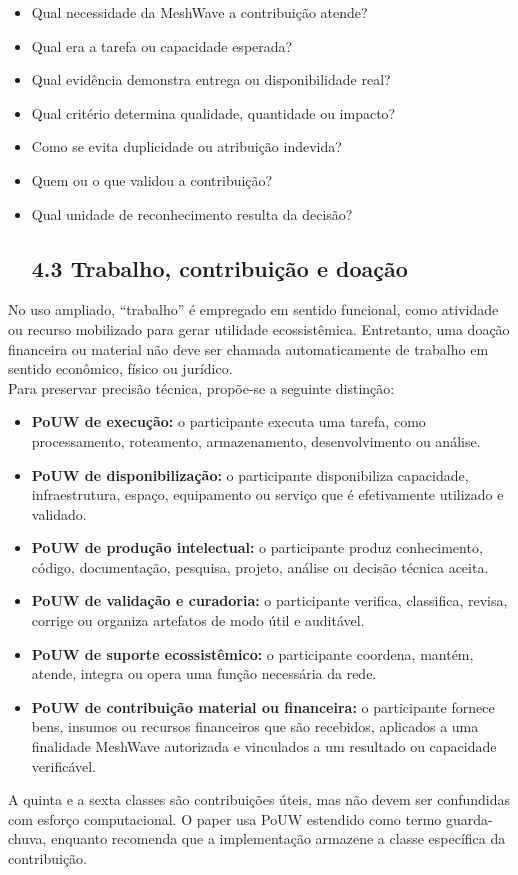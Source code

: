 \documentclass[12pt,a4paper]{article}
\begin{document}
\begin{itemize}
\item Qual necessidade da MeshWave a contribuição atende?
\item Qual era a tarefa ou capacidade esperada?
\item Qual evidência demonstra entrega ou disponibilidade real?
\item Qual critério determina qualidade, quantidade ou impacto?
\item Como se evita duplicidade ou atribuição indevida?
\item Quem ou o que validou a contribuição?
\item Qual unidade de reconhecimento resulta da decisão?

\subsection{4.3 Trabalho, contribuição e doação}

\end{itemize}
No uso ampliado, “trabalho” é empregado em sentido funcional, como atividade ou recurso mobilizado para gerar utilidade ecossistêmica. Entretanto, uma doação financeira ou material não deve ser chamada automaticamente de trabalho em sentido econômico, físico ou jurídico.\\

Para preservar precisão técnica, propõe-se a seguinte distinção:\\

\begin{itemize}
\item \textbf{PoUW de execução:} o participante executa uma tarefa, como processamento, roteamento, armazenamento, desenvolvimento ou análise.
\item \textbf{PoUW de disponibilização:} o participante disponibiliza capacidade, infraestrutura, espaço, equipamento ou serviço que é efetivamente utilizado e validado.
\item \textbf{PoUW de produção intelectual:} o participante produz conhecimento, código, documentação, pesquisa, projeto, análise ou decisão técnica aceita.
\item \textbf{PoUW de validação e curadoria:} o participante verifica, classifica, revisa, corrige ou organiza artefatos de modo útil e auditável.
\item \textbf{PoUW de suporte ecossistêmico:} o participante coordena, mantém, atende, integra ou opera uma função necessária da rede.
\item \textbf{PoUW de contribuição material ou financeira:} o participante fornece bens, insumos ou recursos financeiros que são recebidos, aplicados a uma finalidade MeshWave autorizada e vinculados a um resultado ou capacidade verificável.

\end{itemize}
A quinta e a sexta classes são contribuições úteis, mas não devem ser confundidas com esforço computacional. O paper usa PoUW estendido como termo guarda-chuva, enquanto recomenda que a implementação armazene a classe específica da contribuição.\\
\end{document}

